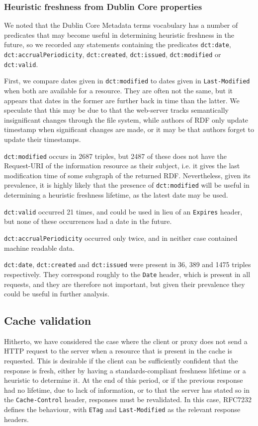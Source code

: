 \documentclass{llncs}
\newcommand{\rdfterm}[1]{\texttt{#1}}
\newcommand{\httph}[1]{\texttt{#1}}
\begin{document}
\subsubsection{Heuristic freshness from Dublin Core properties}

We noted that the Dublin Core Metadata terms vocabulary has a number
of predicates that may become useful in determining heuristic
freshness in the future, so we recorded any statements containing the
predicates \rdfterm{dct:date}, \rdfterm{dct:accrualPeriodicity},
\rdfterm{dct:created}, \rdfterm{dct:issued}, \rdfterm{dct:modified} or
\rdfterm{dct:valid}.

First, we compare dates given in \rdfterm{dct:modified} to dates given
in \httph{Last-Modified} when both are available for a resource. They
are often not the same, but it appears that dates in the former are
further back in time than the latter. We speculate that this may be
due to that the web-server tracks semantically insignificant changes
through the file system, while authors of RDF only update timestamp
when significant changes are made, or it may be that authors forget to
update their timestamps.

\rdfterm{dct:modified} occurs in 2687 triples, but 2487 of these does
not have the Request-URI of the information resource as their subject,
i.e. it gives the last modification time of some subgraph of the
returned RDF. Nevertheless, given its prevalence, it is highly likely
that the presence of \rdfterm{dct:modified} will be useful in
determining a heuristic freshness lifetime, as the latest date may be
used.

\rdfterm{dct:valid} occurred 21 times, and could be used in lieu of an
\httph{Expires} header, but none of these occurrences had a date in the
future.

\rdfterm{dct:accrualPeriodicity} occurred only twice, and in neither
case contained machine readable data.

\rdfterm{dct:date}, \rdfterm{dct:created} and \rdfterm{dct:issued}
were present in 36, 389 and 1475 triples respectively. They correspond
roughly to the \httph{Date} header, which is present in all requests,
and they are therefore not important, but given their prevalence they
could be useful in further analysis.

\subsection{Cache validation}

Hitherto, we have considered the case where the client or proxy does
not send a HTTP request to the server when a resource that is present
in the cache is requested. This is desirable if the client can be
sufficiently confident that the response is fresh, either by having a
standards-compliant freshness lifetime or a heuristic to determine
it. At the end of this period, or if the previous response had no
lifetime, due to lack of information, or to that the server has stated
so in the \httph{Cache-Control} header, responses must be
revalidated. In this case, RFC7232 defines the behaviour, with
\httph{ETag} and \httph{Last-Modified} as the relevant response
headers.
\end{document}
